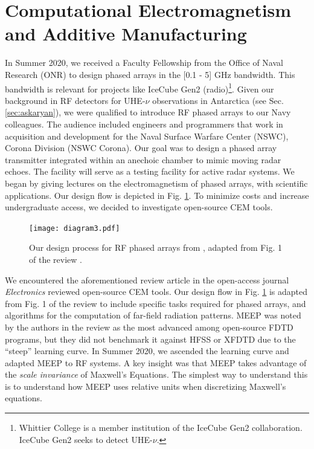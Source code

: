 \documentclass[../../main.tex]{subfiles}
\begin{document}
\section{Computational Electromagnetism and Additive Manufacturing}
\label{sec:cem}

In Summer 2020, we received a Faculty Fellowship from the Office of Naval Research (ONR) to design phased arrays in the [0.1 - 5] GHz bandwidth.  This bandwidth is relevant for projects like IceCube Gen2 (radio)\footnote{Whittier College is a member institution of the IceCube Gen2 collaboration.  IceCube Gen2 seeks to detect UHE-$\nu$.}.  Given our background in RF detectors for UHE-$\nu$ observations in Antarctica (see Sec. \ref{sec:askaryan}), we were qualified to introduce RF phased arrays to our Navy colleagues.  The audience included engineers and programmers that work in acquisition and development for the Naval Surface Warfare Center (NSWC), Corona Division (NSWC Corona).  Our goal was to design a phased array transmitter integrated within an anechoic chamber to mimic moving radar echoes.  The facility will serve as a testing facility for active radar systems.  We began by giving lectures on the electromagnetism of phased arrays, with scientific applications.  Our design flow is depicted in Fig. \ref{fig:design}.  To minimize costs and increase undergraduate access, we decided to investigate open-source CEM tools. \\ \vspace{2.5mm}

\begin{figure}
\centering
\texttt{[image: diagram3.pdf]}
\caption{\label{fig:design}  Our design process for RF phased arrays from \cite{electronics10040415}, adapted from Fig. 1 of the review \cite{10.3390/electronics8121506}.}
\end{figure}

We encountered the aforementioned review article in the open-access journal \textit{Electronics} reviewed open-source CEM tools.  Our design flow in Fig. \ref{fig:design} is adapted from Fig. 1 of the review to include specific tasks required for phased arrays, and algorithms for the computation of far-field radiation patterns.  MEEP was noted by the authors in the review as the most advanced among open-source FDTD programs, but they did not benchmark it against HFSS or XFDTD due to the ``steep'' learning curve.  In Summer 2020, we ascended the learning curve and adapted MEEP to RF systems.  A key insight was that MEEP takes advantage of the \textit{scale invariance} of Maxwell's Equations.  The simplest way to understand this is to understand how MEEP uses relative units when discretizing Maxwell's equations. \\ \vspace{2.5mm}
\end{document}
